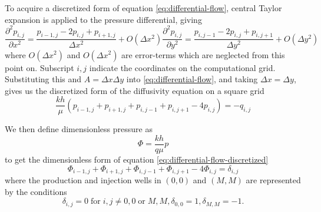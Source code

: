 To acquire a discretized form of equation \eqref{eq:differential-flow}, central Taylor expansion is applied to the pressure differential, giving
\begin{subequations}
    \begin{equation}
        \frac{\partial^2 p_{i,j}}{\partial x^2} = \frac{p_{i-1,j} -2p_{i,j} + p_{i+1,j}}{\Delta x^2} + O(\Delta x^2)
    \end{equation}
    \begin{equation}
        \frac{\partial^2 p_{i,j}}{\partial y^2} = \frac{p_{i,j-1} -2p_{i,j} + p_{i,j+1}}{\Delta y^2} + O(\Delta y^2)
    \end{equation}
\end{subequations}
where $O(\Delta x^2)$ and $O(\Delta x^2)$ are error-terms which are neglected from this point on. Subscript $i,j$ indicate the coordinates on the computational grid. Substituting this and $A=\Delta x \Delta y$ into \eqref{eq:differential-flow}, and taking $\Delta x = \Delta y$, gives us the discretized form of the diffusivity equation on a square grid
\begin{equation}
    \label{eq:differential-flow-discretized}
    \frac{kh}{\mu} \left( p_{i-1,j} + p_{i+1,j} + p_{i,j-1} + p_{i,j+1} -4p_{i,j} \right) = -q_{i,j}
\end{equation}

We then define dimensionless pressure as
\begin{equation}
    \label{eq:dimensionless-pressure}
    \Phi = \frac{kh}{q\mu} p
\end{equation}
to get the dimensionless form of equation \eqref{eq:differential-flow-discretized} \cite{Peaceman1978Interpretation}
\begin{equation}
    \label{eq:differential-flow-discretzed-dimensionless}
     \Phi_{i-1,j} + \Phi_{i+1,j} + \Phi_{i,j-1}  + \Phi_{i,j+1} -4 \Phi_{i,j}  = \delta_{i,j}
\end{equation}
where the production and injection wells in $(0,0)$ and $(M,M)$ are represented by the conditions
\begin{subequations}
    \label{eq:well-conditions}
    \begin{equation}
        \delta_{i,j} = 0 \;\mathrm{for}\; i,j \neq 0,0 \;\mathrm{or}\; M,M,
    \end{equation}
    \begin{equation}
        \delta_{0,0} = 1,
    \end{equation}
    \begin{equation}
        \delta_{M,M} = -1.
    \end{equation}
\end{subequations}


